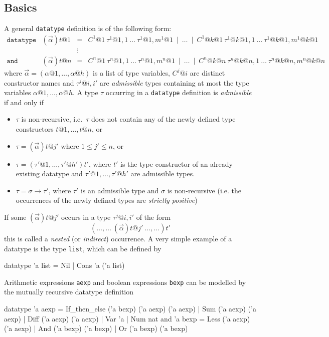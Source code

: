 \subsection{Basics}
\label{subsec:datatype:basics}

A general \texttt{datatype} definition is of the following form:
\[
\begin{array}{llcl}
\mathtt{datatype} & (\vec{\alpha})t@1 & = &
  C^1@1~\tau^1@{1,1}~\ldots~\tau^1@{1,m^1@1} ~\mid~ \ldots ~\mid~
    C^1@{k@1}~\tau^1@{k@1,1}~\ldots~\tau^1@{k@1,m^1@{k@1}} \\
 & & \vdots \\
\mathtt{and} & (\vec{\alpha})t@n & = &
  C^n@1~\tau^n@{1,1}~\ldots~\tau^n@{1,m^n@1} ~\mid~ \ldots ~\mid~
    C^n@{k@n}~\tau^n@{k@n,1}~\ldots~\tau^n@{k@n,m^n@{k@n}}
\end{array}
\]
where $\vec{\alpha} = (\alpha@1,\ldots,\alpha@h)$ is a list of type variables,
$C^j@i$ are distinct constructor names and $\tau^j@{i,i'}$ are {\em
  admissible} types containing at most the type variables $\alpha@1, \ldots,
\alpha@h$. A type $\tau$ occurring in a \texttt{datatype} definition is {\em
  admissible} if and only if
\begin{itemize}
\item $\tau$ is non-recursive, i.e.\ $\tau$ does not contain any of the
newly defined type constructors $t@1,\ldots,t@n$, or
\item $\tau = (\vec{\alpha})t@{j'}$ where $1 \leq j' \leq n$, or
\item $\tau = (\tau'@1,\ldots,\tau'@{h'})t'$, where $t'$ is
the type constructor of an already existing datatype and $\tau'@1,\ldots,\tau'@{h'}$
are admissible types.
\item $\tau = \sigma \to \tau'$, where $\tau'$ is an admissible
type and $\sigma$ is non-recursive (i.e. the occurrences of the newly defined
types are {\em strictly positive})
\end{itemize}
If some $(\vec{\alpha})t@{j'}$ occurs in a type $\tau^j@{i,i'}$
of the form
\[
(\ldots,\ldots ~ (\vec{\alpha})t@{j'} ~ \ldots,\ldots)t'
\]
this is called a {\em nested} (or \emph{indirect}) occurrence. A very simple
example of a datatype is the type \texttt{list}, which can be defined by
\begin{ttbox}
datatype 'a list = Nil
                 | Cons 'a ('a list)
\end{ttbox}
Arithmetic expressions \texttt{aexp} and boolean expressions \texttt{bexp} can be modelled
by the mutually recursive datatype definition
\begin{ttbox}
datatype 'a aexp = If_then_else ('a bexp) ('a aexp) ('a aexp)
                 | Sum ('a aexp) ('a aexp)
                 | Diff ('a aexp) ('a aexp)
                 | Var 'a
                 | Num nat
and      'a bexp = Less ('a aexp) ('a aexp)
                 | And ('a bexp) ('a bexp)
                 | Or ('a bexp) ('a bexp)
\end{ttbox}
